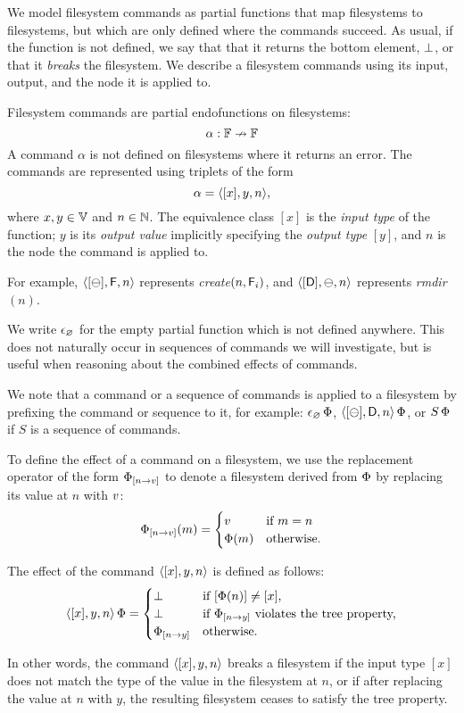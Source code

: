 
We model filesystem commands as partial functions 
that map filesystems to filesystems, but which
are only defined where the commands succeed.
As usual, if the function is not defined, we say that that it returns the bottom element, $\bot$,
or that it \emph{breaks} the filesystem.
We describe a filesystem commands using its input, output, and
the node it is applied to.

\begin{mydef}
Filesystem commands are partial endofunctions on filesystems:
\[ \alpha: \mathbb{F} \nrightarrow \mathbb{F} \]
A command $\alpha$ is not defined on filesystems where it returns an error.
The commands are represented using triplets of the form
\[ \alpha = \langle{[x],y,n}\rangle, \]
where $x,y\in\mathbb{V}$ and $n\in\mathbb{N}$.
The equivalence class $[x]$ is the \emph{input type} of the function;
$y$ is its \emph{output value} implicitly specifying the \emph{output type} $[y]$,
and $n$ is the node the command is applied to.
\end{mydef}
For example, $\langle{[\ominus],\mathsf{F},n}\rangle$ represents \textit{create}$(n,\mathsf{F}_i)$,
and $\langle{[\mathsf{D}],\ominus,n}\rangle$ represents \textit{rmdir}$(n)$.

We write $\epsilon_\varnothing$ for the empty partial function which is not defined anywhere.
This does not naturally occur in sequences of commands we will investigate,
but is useful when reasoning about the combined effects of commands.

We note that a command or a sequence of commands is applied to a filesystem
by prefixing the command or sequence to it, for example: $\epsilon_\varnothing\,\Phi$, $\langle{[\ominus],\mathsf{D},n}\rangle\,\Phi$, 
or $S\,\Phi$ if $S$ is a sequence of commands.

To define the effect of a command on a filesystem, we use
the replacement operator of the form
${\Phi}_{[{n}\rightarrow{v}]}$ to denote a filesystem derived from $\Phi$ 
by replacing its value at $n$ with $v$:
\[ {\Phi}_{[{n}\rightarrow{v}]}(m) =
   \begin{cases}
   v &\textrm{if~} m=n\\
   \Phi(m) &\textrm{otherwise.}
   \end{cases}
\]

\begin{mydef}
The effect of the command $\langle{[x],y,n}\rangle$ is defined as follows:
\[
\langle{[x],y,n}\rangle\,\Phi = 
   \begin{cases}
   \bot &\textrm{if $[\Phi(n)]\neq[x]$,}\\
   \bot &\textrm{if ${\Phi}_{[{n}\rightarrow{y}]}$ violates the tree property,}\\
   {\Phi}_{[{n}\rightarrow{y}]} &\textrm{otherwise.}
   \end{cases}
\]
\end{mydef}
In other words, the command $\langle{[x],y,n}\rangle$ breaks a filesystem if the input type $[x]$
does not match the type of the value in the filesystem at $n$, or if after replacing
the value at $n$ with $y$, the resulting filesystem ceases to satisfy the tree property.

